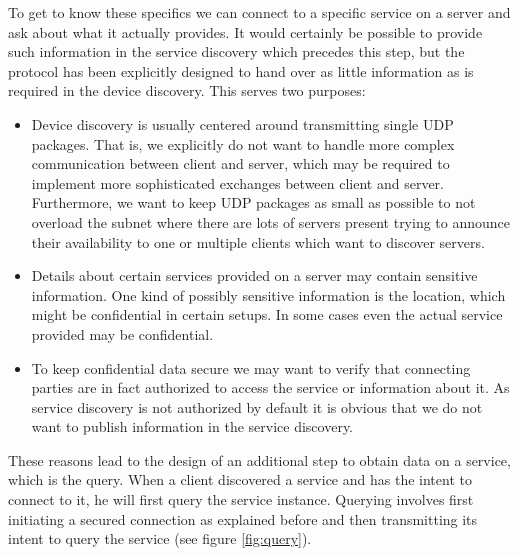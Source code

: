 To get to know these specifics we can connect to a specific service on a server and ask about what it actually provides.
It would certainly be possible to provide such information in the service discovery which precedes this step, but the protocol has been explicitly designed to hand over as little information as is required in the device discovery.
This serves two purposes:
\begin{itemize}
    \item Device discovery is usually centered around transmitting single UDP packages.
        That is, we explicitly do not want to handle more complex communication between client and server, which may be required to implement more sophisticated exchanges between client and server.
        Furthermore, we want to keep UDP packages as small as possible to not overload the subnet where there are lots of servers present trying to announce their availability to one or multiple clients which want to discover servers.
    \item Details about certain services provided on a server may contain sensitive information.
        One kind of possibly sensitive information is the location, which might be confidential in certain setups.
        In some cases even the actual service provided may be confidential.
    \item To keep confidential data secure we may want to verify that connecting parties are in fact authorized to access the service or information about it.
        As service discovery is not authorized by default it is obvious that we do not want to publish information in the service discovery.
\end{itemize}

These reasons lead to the design of an additional step to obtain data on a service, which is the query.
When a client discovered a service and has the intent to connect to it, he will first query the service instance.
Querying involves first initiating a secured connection as explained before and then transmitting its intent to query the service (see figure \ref{fig:query}).

